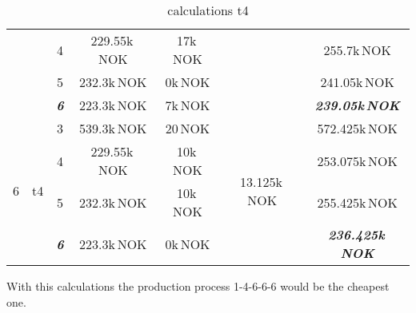 \documentclass{article}
\begin{document}
\begin{table}[hbt!]
\begin{center}
\begin{tabular}[h]{|c|c|c||c|c|c||c|}
&	&	4		&		229.55k\,NOK		&	17k\,NOK		&										&	255.7k\,NOK\\
&	&	5		&		232.3k\,NOK			&	0k\,NOK			&										&	241.05k\,NOK\\
&	&	\textit{\textbf{6}}		&		223.3k\,NOK			&	7k\,NOK			&					&	\textit{\textbf{239.05k\,NOK}}\\
\hline
\multirow{4}{*}{6} & \multirow{4}{*}{t4}	
	&	3		&		539.3k\,NOK			&	20\,NOK			&	\multirow{4}{*}{13.125k\,NOK}		&	572.425k\,NOK\\
&	&	4		&		229.55k\,NOK		&	10k\,NOK		&										&	253.075k\,NOK\\
&	&	5		&		232.3k\,NOK			&	10k\,NOK		&										&	255.425k\,NOK\\
&	&	\textit{\textbf{6}}		&		223.3k\,NOK			&	0k\,NOK			&					&	\textit{\textbf{236.425k\,NOK}}\\
\hline
\end{tabular}
\caption{calculations t4}\label{tab:calct4}
\end{center}
\end{table}
With this calculations the production process 1-4-6-6-6 would be the cheapest one.
\end{document}
